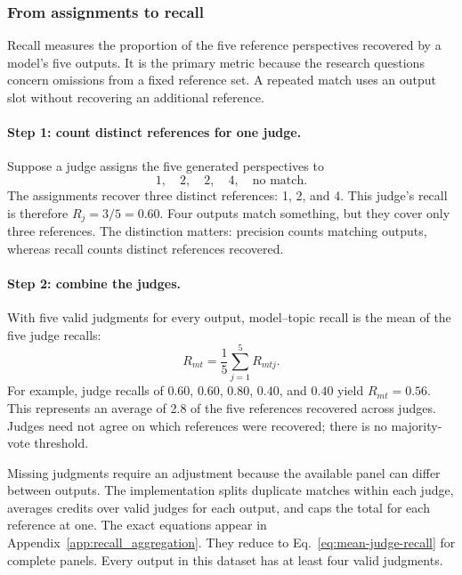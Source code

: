 \documentclass[11pt,a4paper]{article}
\begin{document}
\subsubsection{From assignments to recall}
\label{sec:recall}
Recall measures the proportion of the five reference perspectives recovered by a model's five outputs. It is the primary metric because the research questions concern omissions from a fixed reference set. A repeated match uses an output slot without recovering an additional reference.

\paragraph{Step 1: count distinct references for one judge.}
Suppose a judge assigns the five generated perspectives to
\[
1,\quad 2,\quad 2,\quad 4,\quad \text{no match}.
\]
The assignments recover three distinct references: 1, 2, and 4. This judge's recall is therefore $R_j=3/5=0.60$. Four outputs match something, but they cover only three references. The distinction matters: precision counts matching outputs, whereas recall counts distinct references recovered.

\paragraph{Step 2: combine the judges.}
With five valid judgments for every output, model--topic recall is the mean of the five judge recalls:
\begin{equation}
R_{mt}=\frac{1}{5}\sum_{j=1}^{5}R_{mtj}.
\label{eq:mean-judge-recall}
\end{equation}
For example, judge recalls of $0.60$, $0.60$, $0.80$, $0.40$, and $0.40$ yield $R_{mt}=0.56$. This represents an average of 2.8 of the five references recovered across judges. Judges need not agree on which references were recovered; there is no majority-vote threshold.

Missing judgments require an adjustment because the available panel can differ between outputs. The implementation splits duplicate matches within each judge, averages credits over valid judges for each output, and caps the total for each reference at one. The exact equations appear in Appendix~\ref{app:recall_aggregation}. They reduce to Eq.~\ref{eq:mean-judge-recall} for complete panels. Every output in this dataset has at least four valid judgments.
\end{document}
